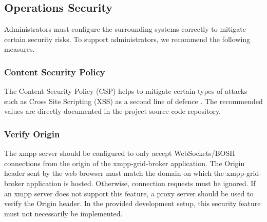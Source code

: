 \subsection{Operations Security}\label{sec:ops-security}

Administrators must configure the surrounding systems correctly to mitigate certain security risks.
To support administrators, we recommend the following measures.

\subsubsection{Content Security Policy}

The Content Security Policy (CSP) helps to mitigate certain types of attacks such as Cross Site Scripting (XSS) as a second line of defence \cite{w3c-csp}.
The recommended values are directly documented in the project source code repository.

\subsubsection{Verify Origin}
The \gls{xmpp} server should be configured to only accept WebSockets/BOSH connections from the origin of the \gls{xmpp-grid-broker} application.
The Origin header sent by the web browser must match the domain on which the \gls{xmpp-grid-broker} application is hosted.
Otherwise, connection requests must be ignored.
If an \gls{xmpp} server does not support this feature, a proxy server should be used to verify the Origin header.
In the provided development setup, this security feature must not necessarily be implemented.
